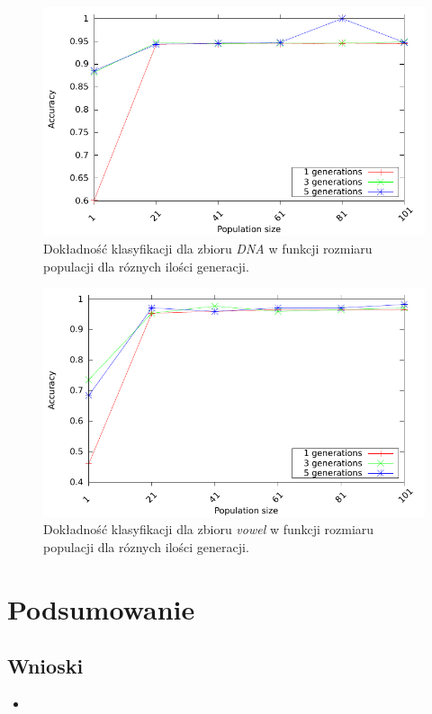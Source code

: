 \documentclass{article}
\begin{document}
		\begin{figure}[h]
		\includegraphics[scale=0.90]{../ecj-svm/results/processed/accuracy-dna}
		\caption{Dokładność klasyfikacji dla zbioru \emph{DNA} w funkcji rozmiaru populacji dla róznych ilości generacji.\label{fig:acc-dna}}
	\end{figure}
	
		\begin{figure}[h]
		\includegraphics[scale=0.90]{../ecj-svm/results/processed/accuracy-vowel}
		\caption{Dokładność klasyfikacji dla zbioru \emph{vowel} w funkcji rozmiaru populacji dla róznych ilości generacji.\label{fig:acc-vowel}}
	\end{figure}
		
		
\section{Podsumowanie}
	\subsection{Wnioski}
		\begin{itemize}
			\item 
		\end{itemize}



%
%
\end{document}

